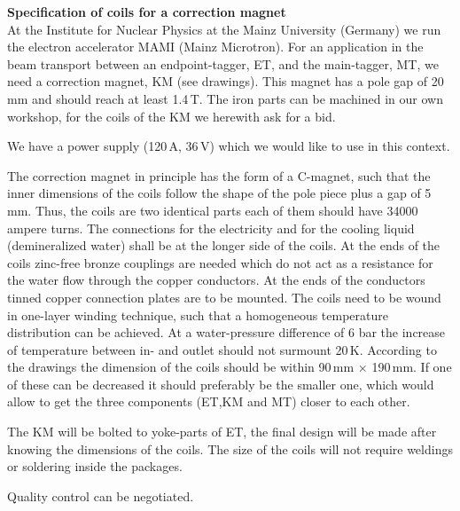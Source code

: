\newpage

{\Large \bf Specification of coils for a correction magnet\\[2ex]}
At the Institute for Nuclear Physics at the Mainz University (Germany)
we run the electron accelerator MAMI (Mainz Microtron).
For an application in the beam transport between an endpoint-tagger,
ET, and
the main-tagger, MT, we need a correction magnet, KM (see drawings). 
This magnet has a pole
gap of 20\,mm and should reach at least 1.4\,T.
The iron parts can be machined in our own workshop, for the coils of the KM
we herewith ask for a bid.

We have a power supply (120\,A, 36\,V) which we would like to use in this
context.

The correction magnet in principle has the form of a C-magnet, 
such that the
inner dimensions of the coils follow the shape of the pole piece plus
a gap of 5\,mm.
Thus, the coils are two identical parts each of them should have
34000 ampere turns. The connections for the electricity and for the cooling
liquid (demineralized water) shall be at the longer side of the coils. 
At the ends of the coils zinc-free bronze couplings are needed which do not
act as a resistance for the water flow through the copper conductors.
At the ends of the conductors tinned copper connection plates are to be
mounted. The coils need to be wound in one-layer winding technique, such
that a homogeneous temperature distribution can be achieved. At a
water-pressure difference of 6 bar the increase of temperature between
in- and outlet should not surmount 20\,K. According to the drawings the
dimension of the coils should be within 
90\,mm $\times$ 190\,mm. If one of these can be decreased it should
preferably be the smaller one, which would allow to get the three
components (ET,KM and MT) closer to each other.

The KM will be bolted to yoke-parts of ET, the final design will be made
after knowing the dimensions of the coils. The size of the coils will not
require weldings or soldering inside the packages.

Quality control can be negotiated.


